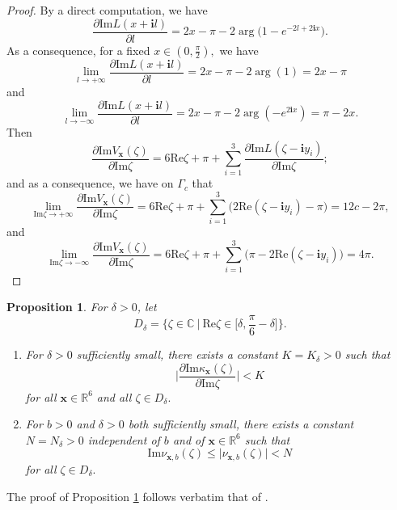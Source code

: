 \documentclass[11pt]{article}
\newtheorem{proposition}[theorem]{Proposition}
\theoremstyle{remark}
\theoremstyle{remark}
\numberwithin{equation}{section}
\begin{document}
\begin{proof} By a direct computation, we have
$$ \frac{\partial \mathrm{Im}L( x +\mathbf il)}{\partial l} =2 x -\pi-2\arg\Big(1-e^{-2l+2\mathbf i x}\Big).$$
As a consequence, for a fixed $ x\in (0,\frac{\pi}{2}),$ we have
$$\lim_{l\to +\infty} \frac{\partial \mathrm{Im}L( x +\mathbf il)}{\partial l} =2 x -\pi -2\arg(1)=2 x -\pi$$
and
$$\lim_{l\to -\infty} \frac{\partial \mathrm{Im}L( x +\mathbf il)}{\partial l} =2 x -\pi-2\arg(-e^{2\mathbf i x })=\pi-2 x .$$
Then
$$\frac{\partial \mathrm{Im}V_{\boldsymbol x}(\zeta)}{\partial \mathrm{Im}\zeta} =6\mathrm{Re}\zeta+\pi+\sum_{i=1}^3\frac{\partial \mathrm{Im}L(\zeta-\mathbf iy_i)}{\partial \mathrm{Im}\zeta};$$
and as a consequence, we have on $\Gamma _c$ that 
$$\lim_{\mathrm{Im}\zeta\to +\infty}\frac{\partial \mathrm{Im}V_{\boldsymbol x}(\zeta)}{\partial \mathrm{Im}\zeta}=6\mathrm{Re}\zeta+\pi+\sum_{i=1}^3\big(2\mathrm{Re}(\zeta-\mathbf iy_i)-\pi\big)=12c-2\pi,$$
and
$$\lim_{\mathrm{Im}\zeta\to -\infty}\frac{\partial \mathrm{Im}V_{\boldsymbol x}(\zeta)}{\partial \mathrm{Im}\zeta}=6\mathrm{Re}\zeta+\pi+\sum_{i=1}^3\big(\pi-2\mathrm{Re}(\zeta-\mathbf iy_i)\big)=4\pi.$$
\end{proof}





 \begin{proposition}\label{bound} 
 For $\delta >0$, let  $$D_{\delta}=\bigg\{\zeta\in \mathbb C\ \bigg|\ \mathrm {Re}\zeta\in\Big[\delta,\frac{\pi}{6}-\delta\Big]\bigg\}.$$
 
 \begin{enumerate}[(1)]
 \item 
 For $\delta> 0$  sufficiently small, there exists a constant $K=K_{\delta}>0$ such that 
$$\Bigg|\frac{\partial \mathrm{Im}\kappa_{\boldsymbol x}(\zeta)}{\partial\mathrm{Im}\zeta}\Bigg|<K$$
for all $\boldsymbol x\in\mathbb R^6$ and all $\zeta\in D_{\delta}.$
\item  
For $b>0$ and $\delta> 0$ both sufficiently small, there exists a constant $N=N_{\delta}>0$ independent of $b$ and of  $\boldsymbol x\in\mathbb R^6$ such that 
$$\mathrm{Im}\nu_{\boldsymbol x,b}(\zeta) \leqslant \big|\nu_{\boldsymbol x,b}(\zeta)\big|<N$$
for all $\zeta\in D_{\delta}.$
\end{enumerate}
\end{proposition}


The proof of Proposition \ref{bound} follows verbatim that of \cite[Proposition 3.10 and Proposition 3.11]{LMSWY}. 
\end{document}
